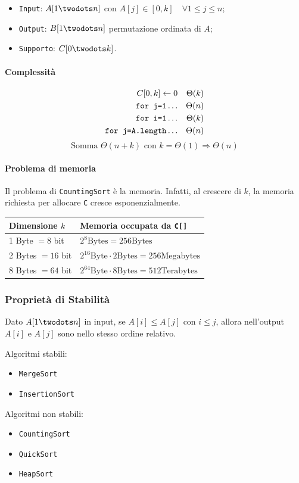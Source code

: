 \begin{itemize}[label=]
    \item \texttt{Input}: $A[1\twodots n]$ con $A[j] \in [0,k] \quad \forall 1 \leq j \leq n$;
    \item \texttt{Output}: $B[1\twodots n]$ permutazione ordinata di $A$;
    \item \texttt{Supporto}: $C[0\twodots k]$.
\end{itemize}

 

\paragraph{Complessità} 
\begin{align*}
    C[0,k] \leftarrow 0 && \Theta(k) \\
    \text{\texttt{for j=1}} \dots && \Theta(n) \\
    \text{\texttt{for i=1}} \dots && \Theta(k) \\
    \text{\texttt{for j=A.length}} \dots && \Theta(n)
\end{align*}
$$\text{Somma } \Theta(n+k) \text{ con } k = \Theta(1) \Rightarrow \Theta(n)$$

\paragraph{Problema di memoria} Il problema di \texttt{CountingSort} è la memoria. 
Infatti, al crescere di $k$, la memoria richiesta per allocare \texttt{C} cresce esponenzialmente.
\begin{center}
    \begin{tabular}{|l|l|}
        \hline
        Dimensione $k$ & Memoria occupata da \texttt{C[]} \\
        \hline
        1 Byte $= 8$ bit & $2^8 \text{Bytes} = 256 \text{Bytes}$ \\
        2 Bytes $= 16$ bit & $2^{16} \text{Byte} \cdot 2 \text{Bytes} = 256 \text{Megabytes}$ \\
        8 Bytes $= 64$ bit & $2^{64} \text{Byte} \cdot 8 \text{Bytes} = 512 \text{Terabytes}$ \\
        \hline
    \end{tabular}
\end{center}

\subsubsection{Proprietà di Stabilità}
Dato $A[1 \twodots n]$ in input, se $A[i] \leq A[j]$ con $i \leq j$, allora nell'output $A[i]$ e $A[j]$ sono nello stesso ordine relativo.
\bigskip

Algoritmi stabili:
\begin{itemize}
	\item \texttt{MergeSort}
	\item \texttt{InsertionSort}
\end{itemize}
\bigskip

Algoritmi non stabili:
\begin{itemize}
	\item \texttt{CountingSort}
	\item \texttt{QuickSort}
	\item \texttt{HeapSort}
\end{itemize}